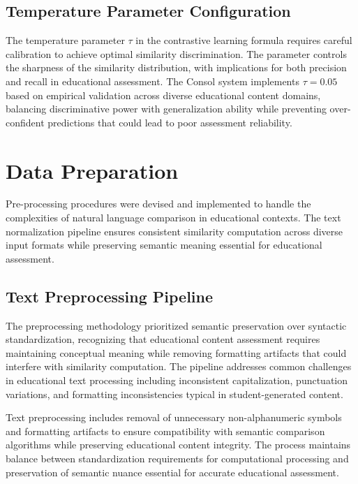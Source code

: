 {\subsection{Temperature Parameter Configuration}

The temperature parameter $\tau$ in the contrastive learning formula requires careful calibration to achieve optimal similarity discrimination. The parameter controls the sharpness of the similarity distribution, with implications for both precision and recall in educational assessment. The Consol system implements $\tau = 0.05$ based on empirical validation across diverse educational content domains, balancing discriminative power with generalization ability while preventing over-confident predictions that could lead to poor assessment reliability.
}

{\color{maroon}
\section{Data Preparation}
\label{sec:data_preparation}

Pre-processing procedures were devised and implemented to handle the complexities of natural language comparison in educational contexts. The text normalization pipeline ensures consistent similarity computation across diverse input formats while preserving semantic meaning essential for educational assessment.

\subsection{Text Preprocessing Pipeline}

The preprocessing methodology prioritized semantic preservation over syntactic standardization, recognizing that educational content assessment requires maintaining conceptual meaning while removing formatting artifacts that could interfere with similarity computation. The pipeline addresses common challenges in educational text processing including inconsistent capitalization, punctuation variations, and formatting inconsistencies typical in student-generated content.

Text preprocessing includes removal of unnecessary non-alphanumeric symbols and formatting artifacts to ensure compatibility with semantic comparison algorithms while preserving educational content integrity. The process maintains balance between standardization requirements for computational processing and preservation of semantic nuance essential for accurate educational assessment.

}

